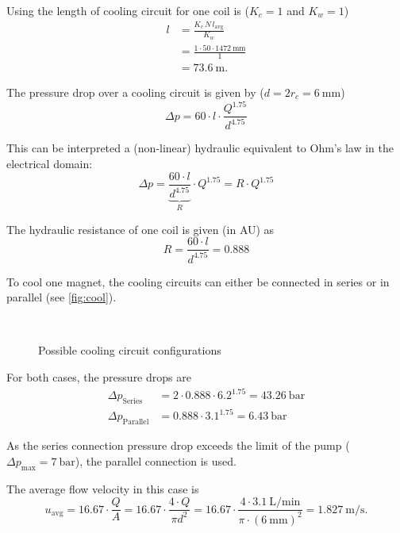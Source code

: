 \documentclass[10pt,a4paper,noendnumber=true]{scrartcl}
\begin{document}
Using the length of cooling circuit for one coil is ($K_c=1$ and $K_w=1$)
\begin{align}
    l &= \frac{K_c\,N\,l_\text{avg}}{K_w} \\
    &= \frac{1\cdot50\cdot\SI{1472}{\mm}}{1} \nonumber\\ 
    &= \SI{73.6}{\meter}. \nonumber
\end{align}

The pressure drop over a cooling circuit is given by ($d=2r_c=\SI{6}{\mm}$)
\begin{equation}
    \Delta p = 60 \cdot l \cdot \frac{Q^{1.75}}{d^{4.75}} 
\end{equation}

This can be interpreted a (non-linear) hydraulic equivalent to Ohm's law in the electrical domain:
\begin{equation}
	\Delta p = \underbrace{\frac{60 \cdot l}{d^{4.75}}}_R \cdot Q^{1.75} = R \cdot Q^{1.75}
\end{equation}

The hydraulic resistance of one coil is given (in AU) as
\begin{equation}
R= \frac{60 \cdot l}{d^{4.75}} = 0.888
\end{equation}

To cool one magnet, the cooling circuits can either be connected in series or in parallel (see \autoref{fig:cool}).

\begin{figure}[H]
	\centering\setcounter{subfigure}{0}
	\\
	\caption{Possible cooling circuit configurations}\label{fig:cool}
\end{figure}

For both cases, the pressure drops are
\begin{align}
\Delta p_\text{Series} &= 2 \cdot 0.888 \cdot 6.2^{1.75} = \SI{43.26}{\bar} \\
\Delta p_\text{Parallel} &= 0.888 \cdot 3.1^{1.75} = \SI{6.43}{\bar}
\end{align}

As the series connection pressure drop exceeds the limit of the pump ($\Delta p_\text{max}=\SI{7}{\bar}$), the parallel connection is used.

The average flow velocity in this case is
\begin{equation}
    u_\text{avg} = 16.67 \cdot \frac{Q}{A} = 16.67 \cdot \frac{4\cdot Q}{\pi d^2} = 16.67 \cdot \frac{4 \cdot \SI{3.1}{\liter\per\minute}}{\pi \cdot (\SI{6}{\mm})^{2}} = \SI{1.827}{\meter\per\second}.
\end{equation}
\end{document}
